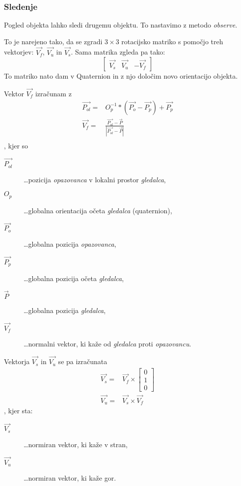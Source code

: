 \documentclass[a4paper]{article}
\begin{document}
\subsubsection{Sledenje}
Pogled objekta lahko sledi drugemu objektu. To nastavimo z metodo \emph{observe}.

To je narejeno tako, da se zgradi $3 \times 3$ rotacijsko matriko s pomočjo treh vektorjev: $\overrightarrow{V_f}$, $\overrightarrow{V_u}$ in $\overrightarrow{V_s}$. Sama matrika zgleda pa tako:
$$
\left[ \begin{array}{ccc}
\overrightarrow{V_s} & \overrightarrow{V_u} & - \overrightarrow{V_f}
\end{array} \right]
$$
To matriko nato dam v Quaternion in z njo določim novo orientacijo objekta.

Vektor $\overrightarrow{V_f}$ izračunam z
\begin{eqnarray*}
\overrightarrow{P_{ol}} =& O_p^{-1} * (\overrightarrow{P_o} - \overrightarrow{P_p}) + \overrightarrow{P_p} \\
\overrightarrow{V_f} =& \frac{\overrightarrow{P_{ol}} - \overrightarrow{P}}{\left| \overrightarrow{P_{ol}} - \overrightarrow{P} \right|} \\
\end{eqnarray*},
kjer so
\begin{description}
  \item[$\overrightarrow{P_{ol}}$] \dots pozicija \emph{opazovanca} v lokalni prostor \emph{gledalca},
  \item[$O_p$] \dots globalna orientacija očeta \emph{gledalca} (quaternion),
  \item[$\overrightarrow{P_o}$] \dots globalna pozicija \emph{opazovanca},
  \item[$\overrightarrow{P_p}$] \dots globalna pozicija očeta \emph{gledalca},
  \item[$\overrightarrow{P}$] \dots globalna pozicija \emph{gledalca},
  \item[$\overrightarrow{V_f}$] \dots normalni vektor, ki kaže od \emph{gledalca} proti \emph{opazovancu}.
\end{description}

Vektorja $\overrightarrow{V_s}$ in $\overrightarrow{V_u}$ se pa izračunata
\begin{eqnarray*}
\overrightarrow{V_s} =& \overrightarrow{V_f} \times \left[\begin{array}{c}0\\1\\ 0\end{array}\right] \\
\overrightarrow{V_u} =& \overrightarrow{V_s} \times \overrightarrow{V_f}
\end{eqnarray*},
kjer sta:
\begin{description}
  \item[$\overrightarrow{V_s}$] \dots normiran vektor, ki kaže v stran,
  \item[$\overrightarrow{V_u}$] \dots normiran vektor, ki kaže gor.
\end{description}
\end{document}
